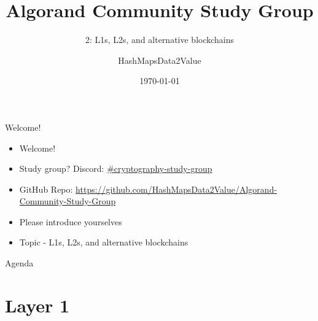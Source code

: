 \documentclass[aspectratio=169,xcolor=dvipsnames]{beamer}
\title[short title]{Algorand Community Study Group}
\subtitle{2: L1s, L2s, and alternative blockchains}
\author[HMD2V] {HashMapsData2Value}
\institute[Algorand] %
{
    Digital Community Champion \\
    Algorand Foundation \\
    \vskip 3pt
}
\date{\today} %
\begin{document}
\begin{frame}
    \titlepage
\end{frame}


\begin{frame}{Welcome!}
\begin{itemize}
    \item Welcome!
    \item Study group? Discord: \href{https://discordapp.com/channels/491256308461207573/1092424979091566622}{\#cryptography-study-group}
    \item GitHub Repo: \href{https://github.com/HashMapsData2Value/Algorand-Community-Study-Group/tree/main/Topics}{https://github.com/HashMapsData2Value/Algorand-Community-Study-Group}
    \item Please introduce yourselves
    \item Topic - L1s, L2s, and alternative blockchains
\end{itemize}
\end{frame}

\begin{frame}{Agenda}
    \tableofcontents[subsubsectionstyle=hide]
\end{frame}

\section{Layer 1}
\end{document}
